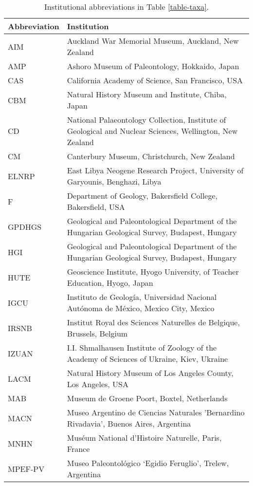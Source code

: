 \begin{longtable}{lp{}}

\caption{Institutional abbreviations in Table \ref{table-taxa}.}\\

\hline
\textbf{Abbreviation} & \textbf{Institution}\\
\hline
AIM &
Auckland War Memorial Museum, Auckland, New Zealand\\
AMP &
Ashoro Museum of Paleontology, Hokkaido, Japan\\
CAS &
California Academy of Science, San Francisco, USA\\
CBM &
Natural History Museum and Institute, Chiba, Japan\\
CD &
National Palaeontology Collection, Institute of Geological and Nuclear Sciences, Wellington, New Zealand\\
CM &
Canterbury Museum, Christchurch, New Zealand\\
ELNRP & 
East Libya Neogene Research Project, University of Garyounis, Benghazi,
Libya\\
F & 
Department of Geology, Bakersfield College, Bakersfield, USA\\
GPDHGS &
Geological and Paleontological Department of the Hungarian Geological Survey, Budapest, Hungary\\
HGI &
Geological and Paleontological Department of the Hungarian Geological Survey, Budapest, Hungary\\
HUTE &
Geoscience Institute, Hyogo University, of Teacher Education, Hyogo, Japan\\
IGCU &
Instituto de Geolog\'{i}a, Universidad Nacional Aut\'{o}noma de M\'{e}xico, Mexico City, Mexico\\
IRSNB &
Institut Royal des Sciences Naturelles de Belgique, Brussels, Belgium\\
IZUAN & 
I.I. Shmalhausen Institute of Zoology of the Academy of Sciences of Ukraine, Kiev, Ukraine\\
LACM &
Natural History Museum of Los Angeles County, Los Angeles, USA\\
MAB &
Museum de Groene Poort, Boxtel, Netherlands\\
MACN &
Museo Argentino de Ciencias Naturales 'Bernardino Rivadavia', Buenos Aires, Argentina\\
MNHN &
Mus\'{e}um National d'Histoire Naturelle, Paris, France\\
MPEF-PV &
Museo Paleontol\'{o}gico `Egidio Feruglio', Trelew, Argentina\\

\end{longtable}

